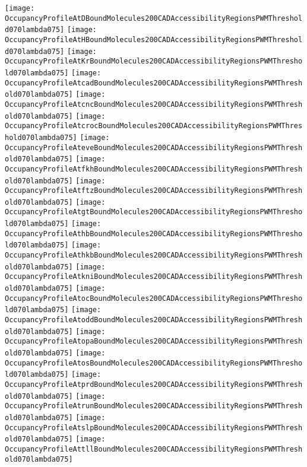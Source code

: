 \documentclass[11pt]{article}
\begin{document}
 


\begin{center}
\texttt{[image: OccupancyProfileAtDBoundMolecules200CADAccessibilityRegionsPWMThreshold070lambda075]}
\texttt{[image: OccupancyProfileAtHBoundMolecules200CADAccessibilityRegionsPWMThreshold070lambda075]}
\texttt{[image: OccupancyProfileAtKrBoundMolecules200CADAccessibilityRegionsPWMThreshold070lambda075]}
\texttt{[image: OccupancyProfileAtcadBoundMolecules200CADAccessibilityRegionsPWMThreshold070lambda075]}
\texttt{[image: OccupancyProfileAtcncBoundMolecules200CADAccessibilityRegionsPWMThreshold070lambda075]}
\texttt{[image: OccupancyProfileAtcrocBoundMolecules200CADAccessibilityRegionsPWMThreshold070lambda075]}
\texttt{[image: OccupancyProfileAteveBoundMolecules200CADAccessibilityRegionsPWMThreshold070lambda075]}
\texttt{[image: OccupancyProfileAtfkhBoundMolecules200CADAccessibilityRegionsPWMThreshold070lambda075]}
\texttt{[image: OccupancyProfileAtftzBoundMolecules200CADAccessibilityRegionsPWMThreshold070lambda075]}
\texttt{[image: OccupancyProfileAtgtBoundMolecules200CADAccessibilityRegionsPWMThreshold070lambda075]}
\texttt{[image: OccupancyProfileAthbBoundMolecules200CADAccessibilityRegionsPWMThreshold070lambda075]}
\texttt{[image: OccupancyProfileAthkbBoundMolecules200CADAccessibilityRegionsPWMThreshold070lambda075]}
\texttt{[image: OccupancyProfileAtkniBoundMolecules200CADAccessibilityRegionsPWMThreshold070lambda075]}
\texttt{[image: OccupancyProfileAtocBoundMolecules200CADAccessibilityRegionsPWMThreshold070lambda075]}
\texttt{[image: OccupancyProfileAtoddBoundMolecules200CADAccessibilityRegionsPWMThreshold070lambda075]}
\texttt{[image: OccupancyProfileAtopaBoundMolecules200CADAccessibilityRegionsPWMThreshold070lambda075]}
\texttt{[image: OccupancyProfileAtosBoundMolecules200CADAccessibilityRegionsPWMThreshold070lambda075]}
\texttt{[image: OccupancyProfileAtprdBoundMolecules200CADAccessibilityRegionsPWMThreshold070lambda075]}
\texttt{[image: OccupancyProfileAtrunBoundMolecules200CADAccessibilityRegionsPWMThreshold070lambda075]}
\texttt{[image: OccupancyProfileAtslpBoundMolecules200CADAccessibilityRegionsPWMThreshold070lambda075]}
\texttt{[image: OccupancyProfileAttllBoundMolecules200CADAccessibilityRegionsPWMThreshold070lambda075]}
\end{center}






\end{document}
